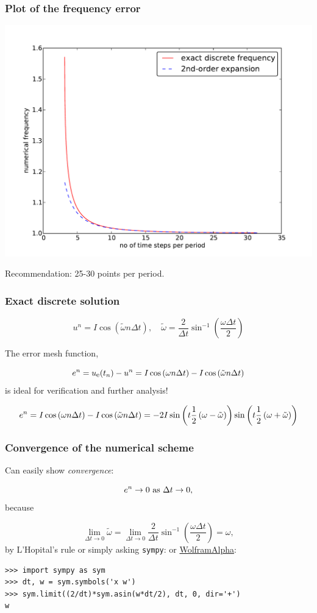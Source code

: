 \documentclass{beamer}
\begin{document}
\begin{frame}
\frametitle{Plot of the frequency error}

\centerline{\includegraphics[width=0.9\linewidth]{fig-vib/discrete_freq.pdf}}



Recommendation: 25-30 points per period.
\end{frame}

\begin{frame}
\frametitle{Exact discrete solution}

\[
u^n = I\cos\left(\tilde\omega n\Delta t\right),\quad
\tilde\omega = \frac{2}{\Delta t}\sin^{-1}\left(\frac{\omega\Delta t}{2}\right)
\]

The error mesh function,

\[ e^n = \uex(t_n) - u^n =
I\cos\left(\omega n\Delta t\right)
- I\cos\left(\tilde\omega n\Delta t\right)
\]
is ideal for verification and further analysis!

\[
e^n = I\cos\left(\omega n\Delta t\right)
- I\cos\left(\tilde\omega n\Delta t\right)
= -2I\sin\left(t\half\left( \omega - \tilde\omega\right)\right)
\sin\left(t\half\left( \omega + \tilde\omega\right)\right)
\]
\end{frame}

\begin{frame}
\frametitle{Convergence of the numerical scheme}

Can easily show \emph{convergence}:

\[ e^n\rightarrow 0 \hbox{ as }\Delta t\rightarrow 0,\]
because

\[
\lim_{\Delta t\rightarrow 0}
\tilde\omega = \lim_{\Delta t\rightarrow 0}
\frac{2}{\Delta t}\sin^{-1}\left(\frac{\omega\Delta t}{2}\right)
= \omega,
\]
by L'Hopital's rule or simply asking \texttt{sympy}:
or \href{{http://www.wolframalpha.com/input/?i=%282%2Fx%29*asin%28w*x%2F2%29+as+x-%3E0}}{WolframAlpha}:

\begin{verbatim}
>>> import sympy as sym
>>> dt, w = sym.symbols('x w')
>>> sym.limit((2/dt)*sym.asin(w*dt/2), dt, 0, dir='+')
w
\end{verbatim}
\end{frame}
\end{document}
